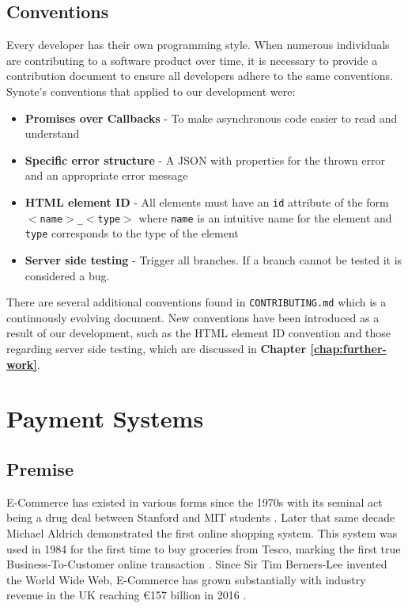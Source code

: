 \subsection{Conventions}
\label{subsec:conventions}

Every developer has their own programming style. When numerous individuals are contributing to a software product over time, it is necessary to provide a contribution document to ensure all developers adhere to the same conventions. Synote's conventions that applied to our development were:

\begin{itemize}
    \item \textbf{Promises over Callbacks} - To make asynchronous code easier to read and understand
    \item \textbf{Specific error structure} - A JSON with properties for the thrown error and an appropriate error message
    \item \textbf{HTML element ID} - All elements must have an \texttt{id} attribute of the form  \texttt{$<$name$>$\_$<$type$>$} where \texttt{name} is an intuitive name for the element and \texttt{type} corresponds to the type of the element
    \item \textbf{Server side testing} - Trigger all branches. If a branch cannot be tested it is considered a bug.
\end{itemize}

There are several additional conventions found in \texttt{CONTRIBUTING.md} which is a continuously evolving document. New conventions have been introduced as a result of our development, such as the HTML element ID convention and those regarding server side testing, which are discussed in \textbf{Chapter \ref{chap:further-work}}.

\section{Payment Systems}
\label{sec:payment-systems}


\subsection{Premise}
\label{sec:payment-intro}

E-Commerce has existed in various forms since the 1970s with its seminal act being a drug deal between Stanford and MIT students \cite{power-mike-online-highs}. Later that same decade Michael Aldrich demonstrated the first online shopping system. This system was used in 1984 for the first time to buy groceries from Tesco, marking the first true Business-To-Customer online transaction \cite{winterman-kelly-online-shopper}. Since Sir Tim Berners-Lee invented the World Wide Web, E-Commerce has grown substantially with industry revenue in the UK reaching \euro{157 billion} in 2016 \cite{khaksar-2016}.\\

